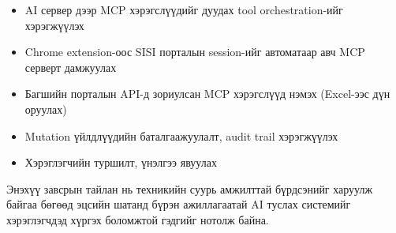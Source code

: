 \documentclass[12pt,a4paper]{report}
\begin{document}
\begin{itemize}
  \item AI сервер дээр MCP хэрэгслүүдийг дуудах tool orchestration-ийг хэрэгжүүлэх
  \item Chrome extension-оос SISI порталын session-ийг автоматаар авч MCP серверт дамжуулах
  \item Багшийн порталын API-д зориулсан MCP хэрэгслүүд нэмэх (Excel-ээс дүн оруулах)
  \item Mutation үйлдлүүдийн баталгаажуулалт, audit trail хэрэгжүүлэх
  \item Хэрэглэгчийн туршилт, үнэлгээ явуулах
\end{itemize}

Энэхүү завсрын тайлан нь техникийн суурь амжилттай бүрдсэнийг харуулж байгаа бөгөөд эцсийн шатанд бүрэн ажиллагаатай AI туслах системийг хэрэглэгчдэд хүргэх боломжтой гэдгийг нотолж байна.

\cleardoublepage



\appendix


\end{document}
